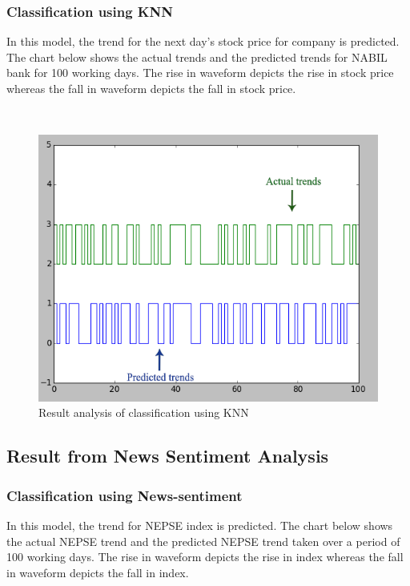 \subsubsection{Classification using KNN}
In this model, the trend for the next day's stock price for company is predicted. The chart below shows the actual trends and the predicted trends for NABIL bank for 100 working days. The rise in waveform depicts the rise in stock price whereas the fall in waveform depicts the fall in stock price.

~

\begin{figure}[H]\centering
  \includegraphics[width=\textwidth]{fig/knn}
  \caption{Result analysis of classification using KNN}
  \label{fig:knn}
\end{figure}

\subsection{Result from News Sentiment Analysis}
\subsubsection{Classification using News-sentiment}
In this model, the trend for NEPSE index is predicted. The chart below shows the actual NEPSE trend and the predicted NEPSE trend taken over a period of 100 working days. The rise in waveform depicts the rise in index whereas the fall in waveform depicts the fall in index.

~

